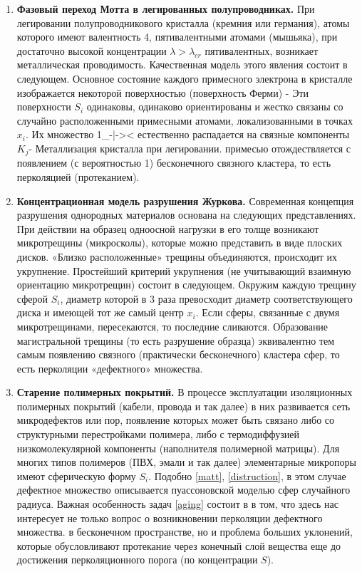 \begin{enumerate}
    \item \label{matt}
    \textbf{Фазовый переход Мотта в легированных полупроводниках.} \newline
        При легировании полупроводникового кристалла (кремния или германия), атомы которого имеют валентность 4, пятивалентными атомами (мышьяка), при достаточно высокой концентрации $\lambda>\lambda_{cr}$ пятивалентных, возникает металлическая проводимость. Качественная модель этого явления состоит в следующем. Основное состояние каждого примесного электрона в кристалле изображается некоторой поверхностью (поверхность Ферми) - Эти поверхности $S_{i}$ одинаковы, одинаково ориентированы и жестко связаны со случайно расположенными примесными атомами, локализованными в точках $x_{i}$. Их множество 1\_-|->< естественно распадается на связные компоненты $K_{j}$- Металлизация кристалла при легировании. примесью отождествляется с появлением (с вероятностью 1) бесконечного связного кластера, то есть перколяцией (протеканием).
    \item \label{distruction}
    \textbf{Концентрационная модель разрушения Журкова.} \newline
        Современная концепция разрушения однородных материалов основана на следующих представлениях. При действии на образец одноосной нагрузки в его толще возникают микротрещины (микросколы), которые можно представить в виде плоских дисков. «Близко расположенные» трещины объединяются, происходит их укрупнение. Простейший критерий укрупнения (не учитывающий взаимную ориентацию микротрещин) состоит в следующем. Окружим каждую трещину сферой $S_{i}$, диаметр которой в $3$ раза превосходит диаметр соответствующего диска и имеющей тот же самый центр $x_{i}$. Если сферы, связанные с двумя микротрещинами, пересекаются, то последние сливаются. Образование магистральной трещины (то есть разрушение образца) эквивалентно тем самым появлению связного (практически бесконечного) кластера сфер, то есть перколяции «дефектного» множества.
    \item \label{aging}
    \textbf{Старение полимерных покрытий.} \newline
        В процессе эксплуатации изоляционных полимерных покрытий (кабели, провода и так далее) в них развивается сеть микродефектов или пор, появление которых может быть связано либо со структурными перестройками полимера, либо с термодиффузией низкомолекулярной компоненты (наполнителя полимерной матрицы). Для многих типов полимеров (ПВХ, эмали и так далее) элементарные микропоры имеют сферическую форму $S_{i}$. Подобно \ref{matt}, \ref{distruction}, в этом случае дефектное множество описывается пуассоновской моделью сфер случайного радиуса. Важная особенность задач \ref{aging} состоит в в том, что здесь нас интересует не только вопрос о возникновении перколяции дефектного множества. в бесконечном пространстве, но и проблема больших уклонений, которые обусловливают протекание через конечный слой вещества еще до достижения перколяционного порога (по концентрации $S$).

\end{enumerate}
